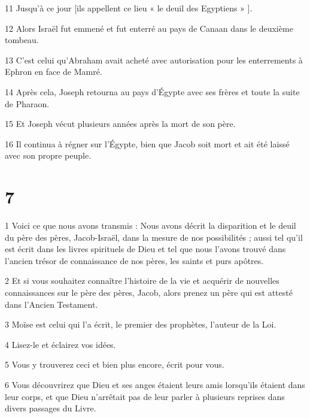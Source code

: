 \par 11 Jusqu'à ce jour [ils appellent ce lieu « le deuil des Egyptiens » ].

\par 12 Alors Israël fut emmené et fut enterré au pays de Canaan dans le deuxième tombeau.

\par 13 C'est celui qu'Abraham avait acheté avec autorisation pour les enterrements à Ephron en face de Mamré.

\par 14 Après cela, Joseph retourna au pays d'Égypte avec ses frères et toute la suite de Pharaon.

\par 15 Et Joseph vécut plusieurs années après la mort de son père.

\par 16 Il continua à régner sur l'Égypte, bien que Jacob soit mort et ait été laissé avec son propre peuple.

\chapter{7}

\par 1 Voici ce que nous avons transmis : Nous avons décrit la disparition et le deuil du père des pères, Jacob-Israël, dans la mesure de nos possibilités ; aussi tel qu'il est écrit dans les livres spirituels de Dieu et tel que nous l'avons trouvé dans l'ancien trésor de connaissance de nos pères, les saints et purs apôtres.

\par 2 Et si vous souhaitez connaître l'histoire de la vie et acquérir de nouvelles connaissances sur le père des pères, Jacob, alors prenez un père qui est attesté dans l'Ancien Testament.

\par 3 Moïse est celui qui l'a écrit, le premier des prophètes, l'auteur de la Loi.

\par 4 Lisez-le et éclairez vos idées.

\par 5 Vous y trouverez ceci et bien plus encore, écrit pour vous.

\par 6 Vous découvrirez que Dieu et ses anges étaient leurs amis lorsqu'ils étaient dans leur corps, et que Dieu n'arrêtait pas de leur parler à plusieurs reprises dans divers passages du Livre.

